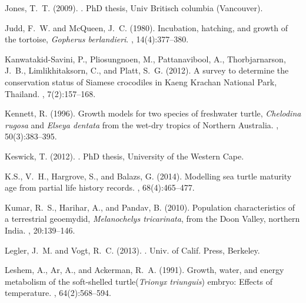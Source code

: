 \documentclass{article}
\begin{document}
\begin{thebibliography}{}
Jones, T.~T. (2009).
.
\newblock PhD thesis, Univ Britisch columbia (Vancouver).

Judd, F.~W. and McQueen, J.~C. (1980).
\newblock Incubation, hatching, and growth of the tortoise, \emph{Gopherus
  berlandieri}.
, 14(4):377--380.

Kanwatakid-Savini, P., Pliosungnoen, M., Pattanavibool, A., Thorbjarnarson,
  J.~B., Limlikhitaksorn, C., and Platt, S.~G. (2012).
\newblock A survey to determine the conservation status of {S}iamese crocodiles
  in {K}aeng {K}rachan {N}ational {P}ark, {T}hailand.
, 7(2):157–168.

Kennett, R. (1996).
\newblock Growth models for two species of freshwater turtle, \emph{Chelodina
  rugosa} and \emph{Elseya dentata} from the wet-dry tropics of {N}orthern
  {A}ustralia.
, 50(3):383--395.

Keswick, T. (2012).
.
\newblock PhD thesis, University of the Western Cape.

K.S., V.~H., Hargrove, S., and Balazs, G. (2014).
\newblock Modelling sea turtle maturity age from partial life history records.
, 68(4):465--477.

Kumar, R.~S., Harihar, A., and Pandav, B. (2010).
\newblock Population characteristics of a terrestrial geoemydid,
  \emph{Melanochelys tricarinata}, from the {D}oon {V}alley, northern {I}ndia.
, 20:139--146.

Legler, J.~M. and Vogt, R.~C. (2013).
.
\newblock Univ. of Calif. Press, Berkeley.

Leshem, A., Ar, A., and Ackerman, R.~A. (1991).
\newblock Growth, water, and energy metabolism of the soft-shelled
  turtle(\emph{Trionyx triunguis}) embryo: Effects of temperature.
, 64(2):568--594.


\end{thebibliography}
\end{document}
